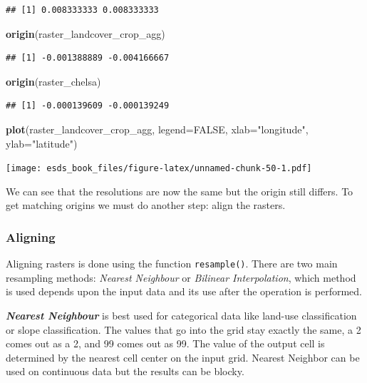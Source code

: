 \documentclass[
]{book}
\newenvironment{Shaded}{\begin{snugshade}}{\end{snugshade}}
\newcommand{\DataTypeTok}[1]{\textcolor[rgb]{0.13,0.29,0.53}{#1}}
\newcommand{\KeywordTok}[1]{\textcolor[rgb]{0.13,0.29,0.53}{\textbf{#1}}}
\newcommand{\NormalTok}[1]{#1}
\newcommand{\OtherTok}[1]{\textcolor[rgb]{0.56,0.35,0.01}{#1}}
\newcommand{\StringTok}[1]{\textcolor[rgb]{0.31,0.60,0.02}{#1}}
\begin{document}
\begin{verbatim}
## [1] 0.008333333 0.008333333
\end{verbatim}

\begin{Shaded}
\begin{Highlighting}[]
\KeywordTok{origin}\NormalTok{(raster_landcover_crop_agg)}
\end{Highlighting}
\end{Shaded}

\begin{verbatim}
## [1] -0.001388889 -0.004166667
\end{verbatim}

\begin{Shaded}
\begin{Highlighting}[]
\KeywordTok{origin}\NormalTok{(raster_chelsa)}
\end{Highlighting}
\end{Shaded}

\begin{verbatim}
## [1] -0.000139609 -0.000139249
\end{verbatim}

\begin{Shaded}
\begin{Highlighting}[]
\KeywordTok{plot}\NormalTok{(raster_landcover_crop_agg, }\DataTypeTok{legend=}\OtherTok{FALSE}\NormalTok{, }\DataTypeTok{xlab=}\StringTok{"longitude"}\NormalTok{, }\DataTypeTok{ylab=}\StringTok{"latitude"}\NormalTok{)}
\end{Highlighting}
\end{Shaded}

\texttt{[image: esds\_book\_files/figure-latex/unnamed-chunk-50-1.pdf]}

We can see that the resolutions are now the same but the origin still differs. To get matching origins we must do another step: align the rasters.

\hypertarget{aligning}{%
\subsubsection{Aligning}\label{aligning}}

Aligning rasters is done using the function \texttt{resample()}. There are two main resampling methods: \emph{Nearest Neighbour} or \emph{Bilinear Interpolation}, which method is used depends upon the input data and its use after the operation is performed.

\textbf{\emph{Nearest Neighbour}} is best used for categorical data like land-use classification or slope classification. The values that go into the grid stay exactly the same, a 2 comes out as a 2, and 99 comes out as 99. The value of the output cell is determined by the nearest cell center on the input grid. Nearest Neighbor can be used on continuous data but the results can be blocky.
\end{document}
